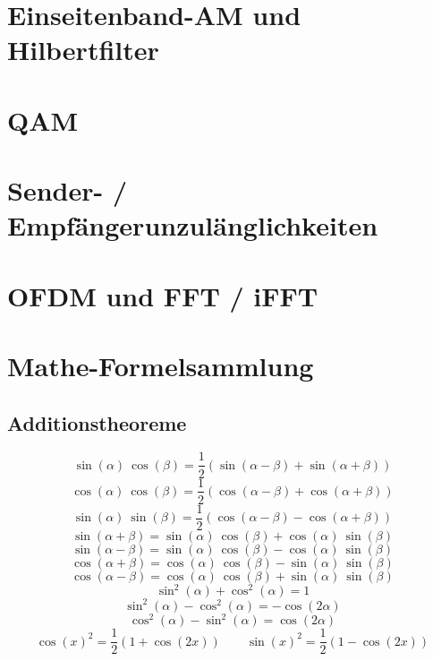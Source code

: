 \documentclass[a4paper, 11pt]{article}
\begin{document}
\section*{Einseitenband-AM und Hilbertfilter}
\section*{QAM}
\section*{Sender- / Empfängerunzulänglichkeiten}
\section*{OFDM und FFT / iFFT}
\section*{Mathe-Formelsammlung}
\subsection*{Additionstheoreme}
\[ \sin(\alpha) ~ \cos(\beta) = \frac{1}{2} (\sin(\alpha - \beta) + \sin(\alpha + \beta)) \]
\[ \cos(\alpha) ~ \cos(\beta) = \frac{1}{2} (\cos(\alpha - \beta) + \cos(\alpha + \beta)) \]
\[ \sin(\alpha) ~ \sin(\beta) = \frac{1}{2} (\cos(\alpha - \beta) - \cos(\alpha + \beta)) \]
\vspace{0.5pt}
\[ \sin(\alpha + \beta) = \sin(\alpha) ~ \cos(\beta) + \cos(\alpha) ~ \sin(\beta) \]
\[ \sin(\alpha - \beta) = \sin(\alpha) ~ \cos(\beta) - \cos(\alpha) ~ \sin(\beta) \]
\[ \cos(\alpha + \beta) = \cos(\alpha) ~ \cos(\beta) - \sin(\alpha) ~ \sin(\beta) \]
\[ \cos(\alpha - \beta) = \cos(\alpha) ~ \cos(\beta) + \sin(\alpha) ~ \sin(\beta) \]
\vspace{0.5pt}
\[ \sin^2(\alpha) + \cos^2(\alpha) = 1 \]
\[ \sin^2(\alpha) - \cos^2(\alpha) = -\cos(2\alpha) \]
\[ \cos^2(\alpha) - \sin^2(\alpha) = \cos(2\alpha) \]
\[ \cos(x)^2 = \frac{1}{2} \left(1 + \cos(2x) \right) \qquad \sin(x)^2 = \frac{1}{2} \left(1 - \cos(2x) \right) \]

\end{document}
